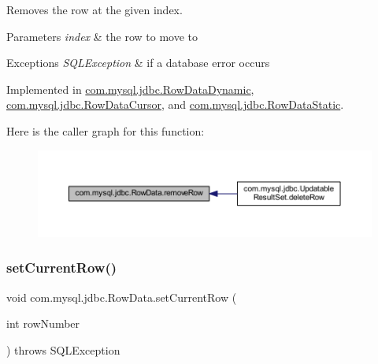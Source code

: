 Removes the row at the given index.


\begin{DoxyParams}{Parameters}
{\em index} & the row to move to \\
\hline
\end{DoxyParams}

\begin{DoxyExceptions}{Exceptions}
{\em S\+Q\+L\+Exception} & if a database error occurs \\
\hline
\end{DoxyExceptions}


Implemented in \mbox{\hyperlink{classcom_1_1mysql_1_1jdbc_1_1_row_data_dynamic_a96a481601d6ef8046687071a42abe97b}{com.\+mysql.\+jdbc.\+Row\+Data\+Dynamic}}, \mbox{\hyperlink{classcom_1_1mysql_1_1jdbc_1_1_row_data_cursor_a8283d0e9ac8563a11f64e5d04b0b5f59}{com.\+mysql.\+jdbc.\+Row\+Data\+Cursor}}, and \mbox{\hyperlink{classcom_1_1mysql_1_1jdbc_1_1_row_data_static_a585e76cb9cacd6c1fea15b2d4739f622}{com.\+mysql.\+jdbc.\+Row\+Data\+Static}}.

Here is the caller graph for this function\+:
\nopagebreak
\begin{figure}[H]
\begin{center}
\leavevmode
\includegraphics[width=350pt]{interfacecom_1_1mysql_1_1jdbc_1_1_row_data_ac60b2e20cd7043fb730f0977386e80be_icgraph}
\end{center}
\end{figure}
\mbox{\label{interfacecom_1_1mysql_1_1jdbc_1_1_row_data_af1db64feefc1ecf2db53a72ec6063839}} 
\subsubsection{\texorpdfstring{set\+Current\+Row()}{setCurrentRow()}}
{\footnotesize\ttfamily void com.\+mysql.\+jdbc.\+Row\+Data.\+set\+Current\+Row (\begin{DoxyParamCaption}\item[{int}]{row\+Number }\end{DoxyParamCaption}) throws S\+Q\+L\+Exception}

